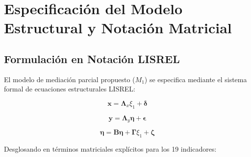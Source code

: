 \documentclass[11pt, a4paper]{article} %
\begin{document}
\section{Especificación del Modelo Estructural y Notación Matricial}

\subsection{Formulación en Notación LISREL}

El modelo de mediación parcial propuesto ($M_1$) se especifica mediante el sistema formal de ecuaciones estructurales LISREL:

\begin{equation}
\mathbf{x} = \mathbf{\Lambda}_x \xi_1 + \boldsymbol{\delta}
\end{equation}

\begin{equation}
\mathbf{y} = \mathbf{\Lambda}_y \boldsymbol{\eta} + \boldsymbol{\epsilon}
\end{equation}

\begin{equation}
\boldsymbol{\eta} = \mathbf{B} \boldsymbol{\eta} + \mathbf{\Gamma} \xi_1 + \boldsymbol{\zeta}
\end{equation}

Desglosando en términos matriciales explícitos para los 19 indicadores:
\end{document}
